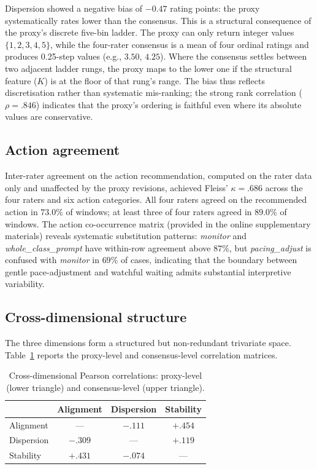 \documentclass[preprint,12pt,authoryear]{elsarticle}
\begin{document}
Dispersion showed a negative bias of $-0.47$ rating points: the proxy systematically rates lower than the consensus. This is a structural consequence of the proxy's discrete five-bin ladder. The proxy can only return integer values $\{1,2,3,4,5\}$, while the four-rater consensus is a mean of four ordinal ratings and produces 0.25-step values (e.g., $3.50$, $4.25$). Where the consensus settles between two adjacent ladder rungs, the proxy maps to the lower one if the structural feature ($K$) is at the floor of that rung's range. The bias thus reflects discretisation rather than systematic mis-ranking; the strong rank correlation ($\rho = .846$) indicates that the proxy's ordering is faithful even where its absolute values are conservative.

\subsection{Action agreement}
\label{sec:results-action}

Inter-rater agreement on the action recommendation, computed on the rater data only and unaffected by the proxy revisions, achieved Fleiss' $\kappa = .686$ across the four raters and six action categories. All four raters agreed on the recommended action in $73.0\%$ of windows; at least three of four raters agreed in $89.0\%$ of windows. The action co-occurrence matrix (provided in the online supplementary materials) reveals systematic substitution patterns: \textit{monitor} and \textit{whole\_class\_prompt} have within-row agreement above $87\%$, but \textit{pacing\_adjust} is confused with \textit{monitor} in $69\%$ of cases, indicating that the boundary between gentle pace-adjustment and watchful waiting admits substantial interpretive variability.

\subsection{Cross-dimensional structure}
\label{sec:results-structure}

The three dimensions form a structured but non-redundant trivariate space. Table~\ref{tab:cross_dim} reports the proxy-level and consensus-level correlation matrices.

\begin{table}[h]
\centering
\caption{Cross-dimensional Pearson correlations: proxy-level (lower triangle) and consensus-level (upper triangle).}
\label{tab:cross_dim}
\begin{tabular}{lccc}
\hline
 & Alignment & Dispersion & Stability \\
\hline
Alignment & --- & $-.111$ & $+.454$ \\
Dispersion & $-.309$ & --- & $+.119$ \\
Stability & $+.431$ & $-.074$ & --- \\
\hline
\end{tabular}
\end{table}
\end{document}

